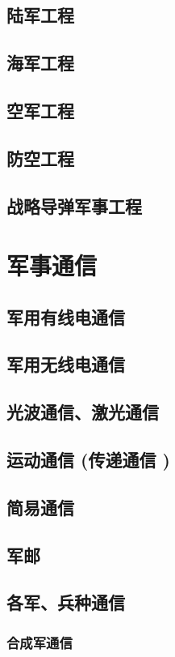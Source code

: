 \documentclass[UTF8]{../ApplicationUniverse}
\begin{document}
    \subsection{陆军工程}
    \subsection{海军工程}
    \subsection{空军工程}
    \subsection{防空工程}
    \subsection{战略导弹军事工程}
\section{军事通信}
    \subsection{军用有线电通信}
    \subsection{军用无线电通信}
    \subsection{光波通信、激光通信}
    \subsection{运动通信 (传递通信 )}
    \subsection{简易通信}
    \subsection{军邮}
    \subsection{各军、兵种通信}
        \subsubsection{合成军通信}
\end{document}
